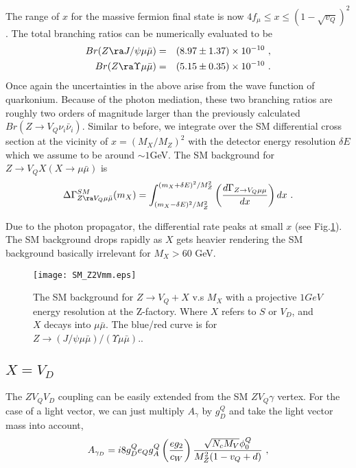 \documentclass[11pt]{article}
\begin{document}
The range of $x$ for the massive fermion final state is now $  4 f_\mu\leq x\leq (1-\sqrt{v_Q})^2$.
The total branching ratios can be numerically evaluated to be
\begin{eqnarray}
Br(Z\ra J/\psi \mu\bar{\mu})&=&  (8.97 \pm 1.37)\times 10^{-10}\ , \\
Br(Z\ra \Upsilon \mu\bar{\mu})&=& (5.15 \pm 0.35)\times 10^{-10}\ .
\end{eqnarray}
Once again the uncertainties in the above arise from the wave function of quarkonium. 
Because of the photon mediation, these two branching ratios are roughly two orders of magnitude larger than the previously calculated $Br(Z\to V_Q \nu_i\bar{\nu}_i)$.
Similar to before, we integrate over the SM differential cross section at the vicinity of $x=(M_X/M_Z)^2$ with the detector energy resolution $\delta E$ which we assume to be around $\sim 1$GeV.  The SM background  for $Z\to V_Q X(X\to \mu\bar{\mu})$ is
\begin{equation}
\Delta \Gamma^{SM}_{Z\ra V_Q \mu\bar{\mu}}(m_X)= \int^{(m_X+\delta E)^2/M_Z^2}_{(m_X-\delta E)^2/M_Z^2} \left(\frac{d \Gamma_{Z\to V_Q \mu\mu}}{dx}\right) dx\ .
\end{equation}

Due to the photon propagator, the differential rate peaks at small $x$ (see Fig.\ref{fig:SMZ2Vmm}).
The SM background drops rapidly as $X$ gets heavier rendering the SM background basically irrelevant for $M_X>60$ GeV.
\begin{figure}
    \centering
    \texttt{[image: SM\_Z2Vmm.eps]}
    \caption{The SM background for $Z\to V_Q+X$ v.s $M_X$ with a projective $1 GeV$ energy resolution at the Z-factory. Where $X$ refers to $S$ or $V_D$, and $X$ decays into $\mu\bar{\mu}$.
    The blue/red curve is for $Z\to (J/\psi \mu\bar{\mu}   )/(\Upsilon \mu\bar{\mu}  )$..
     }
   \label{fig:SMZ2Vmm}
\end{figure}

\subsection{$X =V_D$ }
The $ZV_Q V_D$ coupling can be easily extended from the SM $Z V_Q\gamma$ vertex.
For the case of a light vector, we can just multiply $A_\gamma$ by $g_D^Q$ and take the light vector mass into account,
\begin{equation}
 A_{\gamma_D} = i 8 g^Q_D e_Q g^Q_A  \left(\frac{e g_2}{c_W}\right) {\sqrt{N_c M_V} \phi_0^Q \over M_Z^2(1-v_Q+d)}\ ,
\end{equation}
\end{document}
